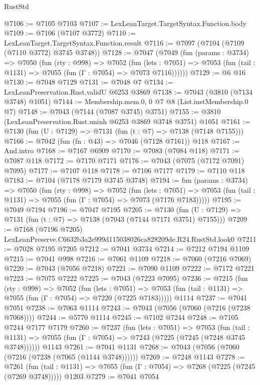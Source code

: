 \begin{lexlean}{RustStd}
\begin{coremodule}
@7106 := @7105 @7103
@7107 := LexLeanTarget.TargetSyntax.Function.body
@7109 := @7106 (@7107 @3772)
@7110 := LexLeanTarget.TargetSyntax.Function.result
@7116 := @7097 (@7104 (@7109 (@7110 @3772) @3745 @3748))
@7128 := @7047
    (@7049
      (fun (params : @3734) =>
      @7050
        (fun (rty : @998) =>
        @7052
          (fun (lets : @7051) =>
          @7053 (fun (tail : @1131) => @7055 (fun (Γ : @7054) => @7073 @7116))))))
@7129 := @6 @16
@7130 := @7048 @7129
@7131 := @7048 @7
@7134 := LexLeanPreservation.Rust.validU @6253 @3869
@7138 := @7043 (@3810 (@7134 @3748) @1051)
@7144 := Membership.mem.{0, 0} @7 @8 (List.instMembership.{0} @7)
@7148 := @7043 (@7144 (@7087 @3745) @3751)
@7155 := @3810 (LexLeanPreservation.Rust.uninh @6253 @3869 @3748 @3751) @1051
@7161 := @7130 (fun (U : @7129) => @7131 (fun (t : @7) => @7138 (@7148 @7155)))
@7166 := @7042 (fun (fn : @43) => @7046 (@7128 @7161)) @118
@7167 := And.intro
@7168 := @7167 @6909
@7170 := @7083 (@7084 @118)
@7171 := @7087 @118
@7172 := @7170 @7171
@7176 := @7043 (@7075 (@7172 @7091) @7095)
@7177 := @7107 @118
@7178 := @7106 @7177
@7179 := @7110 @118
@7183 := @7104 (@7178 @7179 @3745 @3748)
@7194 := fun (params : @3734) =>
  @7050
    (fun (rty : @998) =>
    @7052
      (fun (lets : @7051) =>
      @7053 (fun (tail : @1131) => @7055 (fun (Γ : @7054) => @7073 (@7176 @7183)))))
@7195 := @7049 @7194
@7196 := @7047 @7195
@7205 := @7130 (fun (U : @7129) => @7131 (fun (t : @7) => @7138 (@7043 (@7144 @7171 @3751) @7155)))
@7209 := @7168 (@7196 @7205) LexLeanPreserve.C6632b3a2e999d115038026ca828209de.R24.RustStd.look0
@7211 := @7028 @7195 @7205
@7212 := @7041 @3734
@7214 := @7212 @7194 @1109
@7215 := @7041 @998
@7216 := @7061 @1109
@7218 := @7060 (@7216 @7069)
@7220 := @7043 (@7056 @7218)
@7221 := @7090 @1109
@7222 := @7172 @7221
@7223 := @7075 @7222
@7225 := @7043 (@7223 @7095)
@7236 := @7215
    (fun (rty : @998) =>
    @7052
      (fun (lets : @7051) =>
      @7053 (fun (tail : @1131) => @7055 (fun (Γ : @7054) => @7220 (@7225 @7183)))))
    @1114
@7237 := @7041 @7051
@7238 := @7063 @1114
@7243 := @7043 (@7056 (@7060 (@7216 (@7238 @7068))))
@7244 := @5770 @1114
@7245 := @7102 @7244
@7248 := @7105 @7244 @7177 @7179
@7260 := @7237
    (fun (lets : @7051) =>
    @7053
      (fun (tail : @1131) => @7055 (fun (Γ : @7054) => @7243 (@7225 (@7245 (@7248 @3745 @3748))))))
    @1143
@7261 := @7041 @1131
@7268 := @7043 (@7056 (@7060 (@7216 (@7238 (@7065 (@1144 @3748))))))
@7269 := @7248 @1143
@7278 := @7261
    (fun (tail : @1131) => @7055 (fun (Γ : @7054) => @7268 (@7225 (@7245 (@7269 @3748)))))
    @1203
@7279 := @7041 @7054

\end{coremodule}
\end{lexlean}
